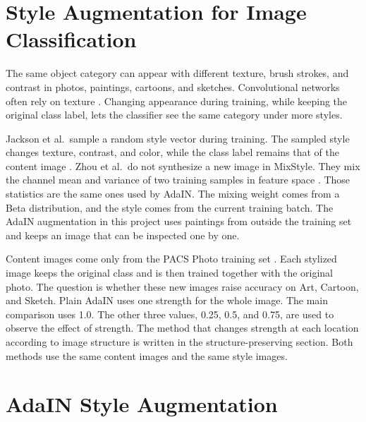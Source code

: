 \documentclass[a4paper]{article}
\begin{document}
\section{Style Augmentation for Image Classification}

The same object category can appear with different texture, brush strokes, and contrast in photos, paintings, cartoons, and sketches. Convolutional networks often rely on texture \cite{geirhos2019imagenet}. Changing appearance during training, while keeping the original class label, lets the classifier see the same category under more styles.

Jackson et al.\ sample a random style vector during training. The sampled style changes texture, contrast, and color, while the class label remains that of the content image \cite{jackson2019style}. Zhou et al.\ do not synthesize a new image in MixStyle. They mix the channel mean and variance of two training samples in feature space \cite{zhou2021mixstyle}. Those statistics are the same ones used by AdaIN. The mixing weight comes from a Beta distribution, and the style comes from the current training batch. The AdaIN augmentation in this project uses paintings from outside the training set and keeps an image that can be inspected one by one.

Content images come only from the PACS Photo training set \cite{li2017deeper}. Each stylized image keeps the original class and is then trained together with the original photo. The question is whether these new images raise accuracy on Art, Cartoon, and Sketch. Plain AdaIN uses one strength for the whole image. The main comparison uses 1.0. The other three values, 0.25, 0.5, and 0.75, are used to observe the effect of strength. The method that changes strength at each location according to image structure is written in the structure-preserving section. Both methods use the same content images and the same style images.

\section{AdaIN Style Augmentation}
\end{document}
